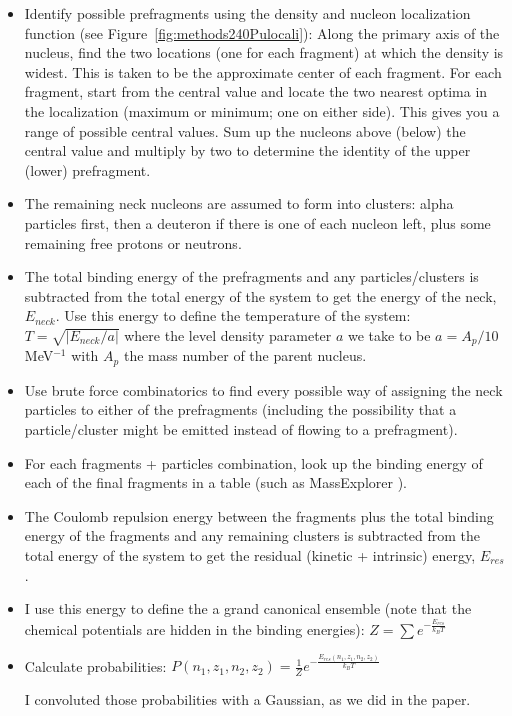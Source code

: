 \begin{itemize}
	\item Identify possible prefragments using the density and nucleon localization function (see Figure~\ref{fig:methods240Pulocali}):
		\subitem Along the primary axis of the nucleus, find the two locations (one for each fragment) at which the density is widest. This is taken to be the approximate center of each fragment.
		\subitem For each fragment, start from the central value and locate the two nearest optima in the localization (maximum or minimum; one on either side). This gives you a range of possible central values.
		\subitem Sum up the nucleons above (below) the central value and multiply by two to determine the identity of the upper (lower) prefragment.
	\item The remaining neck nucleons are assumed to form into clusters: alpha particles first, then a deuteron if there is one of each nucleon left, plus some remaining free protons or neutrons.
	\item The total binding energy of the prefragments and any particles/clusters is subtracted from the total energy of the system to get the energy of the neck, $E_{neck}$.
		\subitem Use this energy to define the temperature of the system: $T = \sqrt{\left|E_{neck}/a\right|}$ where the level density parameter $a$ we take to be $a=A_p/10$ MeV$^{-1}$ with $A_p$ the mass number of the parent nucleus.
	\item Use brute force combinatorics to find every possible way of assigning the neck particles to either of the prefragments (including the possibility that a particle/cluster might be emitted instead of flowing to a prefragment).
	\item For each fragments + particles combination, look up the binding energy of each of the final fragments in a table (such as  MassExplorer \cite{massexplorer}).
	\item The Coulomb repulsion energy between the fragments plus the total binding energy of the fragments and any remaining clusters is subtracted from the total energy of the system to get the residual (kinetic + intrinsic) energy, $E_{res}$.
	\item I use this energy to define the a grand canonical ensemble (note that the chemical potentials are hidden in the binding energies): $Z = \sum e^{-\frac{E_{res}}{k_BT}}$
	\item Calculate probabilities: $P(n_1,z_1,n_2,z_2) = \frac{1}{Z} e^{-\frac{E_{res}(n_1,z_1,n_2,z_2)}{k_BT}}$
	\item [I convoluted those probabilities with a Gaussian, as we did in the paper.]
\end{itemize}

